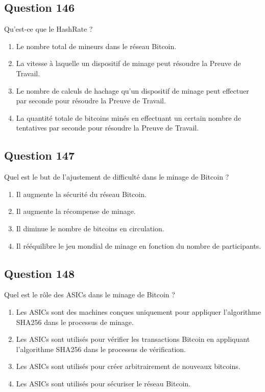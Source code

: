 \documentclass[12pt,a4paper]{article}
\begin{document}
\bigskip


\subsection*{Question 146}
Qu'est-ce que le HashRate ?

\begin{enumerate}[label=\Alph*., leftmargin=*]
\item Le nombre total de mineurs dans le réseau Bitcoin.
\item La vitesse à laquelle un dispositif de minage peut résoudre la Preuve de Travail.
\item Le nombre de calculs de hachage qu'un dispositif de minage peut effectuer par seconde pour résoudre la Preuve de Travail.
\item La quantité totale de bitcoins minés en effectuant un certain nombre de tentatives par seconde pour résoudre la Preuve de Travail.
\end{enumerate}

\bigskip


\subsection*{Question 147}
Quel est le but de l'ajustement de difficulté dans le minage de Bitcoin ?

\begin{enumerate}[label=\Alph*., leftmargin=*]
\item Il augmente la sécurité du réseau Bitcoin.
\item Il augmente la récompense de minage.
\item Il diminue le nombre de bitcoins en circulation.
\item Il rééquilibre le jeu mondial de minage en fonction du nombre de participants.
\end{enumerate}

\bigskip


\subsection*{Question 148}
Quel est le rôle des ASICs dans le minage de Bitcoin ?

\begin{enumerate}[label=\Alph*., leftmargin=*]
\item Les ASICs sont des machines conçues uniquement pour appliquer l'algorithme SHA256 dans le processus de minage.
\item Les ASICs sont utilisés pour vérifier les transactions Bitcoin en appliquant l'algorithme SHA256 dans le processus de vérification.
\item Les ASICs sont utilisés pour créer arbitrairement de nouveaux bitcoins.
\item Les ASICs sont utilisés pour sécuriser le réseau Bitcoin.
\end{enumerate}
\end{document}
